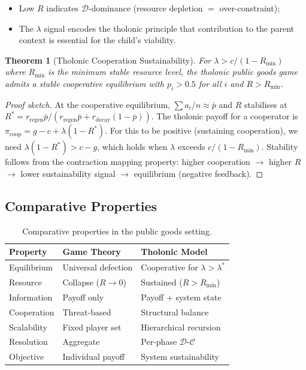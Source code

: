 \documentclass[12pt,a4paper,twocolumn]{article}
\newtheorem{theorem}{Theorem}[section]
\newcommand{\D}{\mathcal{D}}
\newcommand{\CC}{\mathcal{C}}
\begin{document}
\begin{itemize}[nosep]
  \item Low $R$ indicates $\D$-dominance (resource depletion $=$ over-constraint);
  \item The $\lambda$ signal encodes the tholonic principle that contribution to the parent context is essential for the child's viability.
\end{itemize}

\begin{theorem}[Tholonic Cooperation Sustainability]
\label{thm:cooperation}
For $\lambda > c / (1 - R_{\min})$ where $R_{\min}$ is the minimum stable resource level, the tholonic public goods game admits a stable cooperative equilibrium with $p_i > 0.5$ for all $i$ and $R > R_{\min}$.
\end{theorem}

\begin{proof}[Proof sketch]
At the cooperative equilibrium, $\sum a_i / n \approx \bar{p}$ and $R$ stabilises at $R^* = r_{\mathrm{regen}} \bar{p} / (r_{\mathrm{regen}} \bar{p} + r_{\mathrm{decay}}(1-\bar{p}))$.
The tholonic payoff for a cooperator is $\pi_{\mathrm{coop}} = g - c + \lambda(1-R^*)$.
For this to be positive (sustaining cooperation), we need $\lambda(1-R^*) > c - g$, which holds when $\lambda$ exceeds $c/(1-R_{\min})$.
Stability follows from the contraction mapping property: higher cooperation $\to$ higher $R$ $\to$ lower sustainability signal $\to$ equilibrium (negative feedback).
\end{proof}

\subsection{Comparative Properties}

\begin{table}[ht]
\centering
\scriptsize
\caption{Comparative properties in the public goods setting.}
\label{tab:comparison}
\begin{tabular}{@{}p{1.8cm}p{2.4cm}p{2.6cm}@{}}
\toprule
\textbf{Property} & \textbf{Game Theory} & \textbf{Tholonic Model} \\
\midrule
Equilibrium & Universal defection & Cooperative for $\lambda > \lambda^*$ \\
Resource & Collapse ($R \to 0$) & Sustained ($R > R_{\min}$) \\
Information & Payoff only & Payoff + system state \\
Cooperation & Threat-based & Structural balance \\
Scalability & Fixed player set & Hierarchical recursion \\
Resolution & Aggregate & Per-phase $\D$-$\CC$ \\
Objective & Individual payoff & System sustainability \\
\bottomrule
\end{tabular}
\end{table}
\end{document}
